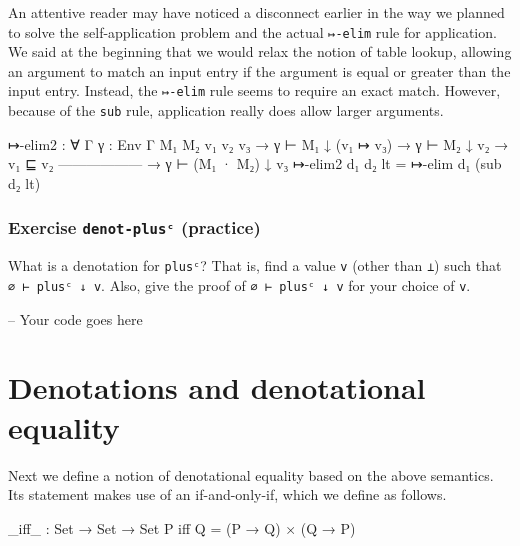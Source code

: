 An attentive reader may have noticed a disconnect earlier in the way we
planned to solve the self-application problem and the actual
\texttt{↦-elim} rule for application. We said at the beginning that we
would relax the notion of table lookup, allowing an argument to match an
input entry if the argument is equal or greater than the input entry.
Instead, the \texttt{↦-elim} rule seems to require an exact match.
However, because of the \texttt{sub} rule, application really does allow
larger arguments.

\begin{fence}
\begin{code}
↦-elim2 : ∀ {Γ} {γ : Env Γ} {M₁ M₂ v₁ v₂ v₃}
  → γ ⊢ M₁ ↓ (v₁ ↦ v₃)
  → γ ⊢ M₂ ↓ v₂
  → v₁ ⊑ v₂
    ------------------
  → γ ⊢ (M₁ · M₂) ↓ v₃
↦-elim2 d₁ d₂ lt = ↦-elim d₁ (sub d₂ lt)
\end{code}
\end{fence}

\hypertarget{exercise-denot-plusux1d9c-practice}{%
\subsubsection{\texorpdfstring{Exercise \texttt{denot-plusᶜ}
(practice)}{Exercise denot-plusᶜ (practice)}}\label{exercise-denot-plusux1d9c-practice}}

What is a denotation for \texttt{plusᶜ}? That is, find a value
\texttt{v} (other than \texttt{⊥}) such that \texttt{∅\ ⊢\ plusᶜ\ ↓\ v}.
Also, give the proof of \texttt{∅\ ⊢\ plusᶜ\ ↓\ v} for your choice of
\texttt{v}.

\begin{fence}
\begin{code}
-- Your code goes here
\end{code}
\end{fence}

\hypertarget{denotations-and-denotational-equality}{%
\section{Denotations and denotational
equality}\label{denotations-and-denotational-equality}}

Next we define a notion of denotational equality based on the above
semantics. Its statement makes use of an if-and-only-if, which we define
as follows.

\begin{fence}
\begin{code}
_iff_ : Set → Set → Set
P iff Q = (P → Q) × (Q → P)
\end{code}
\end{fence}


